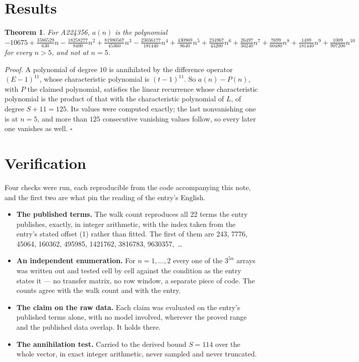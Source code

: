 \documentclass[11pt]{article}
\newtheorem{theorem}{Theorem}
\theoremstyle{definition}
\begin{document}
\section{Results}

\begin{theorem} For A224356, $a(n)$ is the polynomial $-10675 + \frac{3586529}{630}n - \frac{18258277}{8400}n^{2} + \frac{81980567}{45360}n^{3} - \frac{23036177}{181440}n^{4} + \frac{430969}{8640}n^{5} + \frac{234967}{43200}n^{6} + \frac{26497}{30240}n^{7} + \frac{7699}{60480}n^{8} + \frac{1489}{181440}n^{9} + \frac{1009}{907200}n^{10}$ for every $n > 5$, and not at $n = 5$.\end{theorem}

{\itshape Proof.} A polynomial of degree $10$ is annihilated by the difference operator $(E-1)^{11}$, whose characteristic polynomial is $(t-1)^{11}$. So $a(n) - P(n)$, with $P$ the claimed polynomial, satisfies the linear recurrence whose characteristic polynomial is the product of that with the characteristic polynomial of $L$, of degree $S + 11 = 125$. Its values were computed exactly; the last nonvanishing one is at $n = 5$, and more than $125$ consecutive vanishing values follow, so every later one vanishes as well. $\square$

\section{Verification}

Four checks were run, each reproducible from the code accompanying this note, and the first two are what pin the reading of the entry's English.

\begin{itemize}

\item {\bfseries The published terms.} The walk count reproduces all 22 terms the entry publishes, exactly, in integer arithmetic, with the index taken from the entry's stated offset (1) rather than fitted. The first of them are 243, 7776, 45064, 160362, 495985, 1421762, 3816783, 9630357,~\dots

\item {\bfseries An independent enumeration.} For $n = 1,\dots,2$ every one of the $3^{5n}$ arrays was written out and tested cell by cell against the condition as the entry states it --- no transfer matrix, no row window, a separate piece of code. The counts agree with the walk count and with the entry.

\item {\bfseries The claim on the raw data.} Each claim was evaluated on the entry's published terms alone, with no model involved, wherever the proved range and the published data overlap. It holds there.

\item {\bfseries The annihilation test.} Carried to the derived bound $S = 114$ over the whole vector, in exact integer arithmetic, never sampled and never truncated.

\end{itemize}
\end{document}
